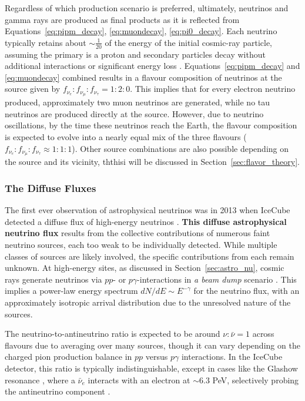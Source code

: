 Regardless of which production scenario is preferred, ultimately, neutrinos and gamma rays are produced as final products as it is reflected from Equations~\ref{eq:pipm_decay}, \ref{eq:muondecay}, \ref{eq:pi0_decay}. Each neutrino typically retains about \( \sim \frac{1}{20} \) of the energy of the initial cosmic-ray particle, assuming the primary is a proton and secondary particles decay without additional interactions or significant energy loss . Equations~\ref{eq:pipm_decay} and \ref{eq:muondecay} combined results in a flavour composition of neutrinos at the source given by $f_{\nu_e} : f_{\nu_\mu} : f_{\nu_\tau} = 1 : 2 : 0$. This implies that for every electron neutrino produced, approximately two muon neutrinos are generated, while no tau neutrinos are produced directly at the source. However, due to neutrino oscillations, by the time these neutrinos reach the Earth, the flavour composition is expected to evolve into a nearly equal mix of the three flavours ($f_{\nu_e} : f_{\nu_\mu} : f_{\nu_\tau} \approx 1 : 1 : 1$). Other source combinations are also possible depending on the source and its vicinity, ththisi will be discussed in Section~\ref{sec:flavor_theory}.

\subsubsection{The Diffuse Fluxes}
\label{sec:diffuse_theory}
The first ever observation of astrophysical neutrinos was in 2013 when IceCube detected a diffuse flux of high-energy neutrinos . \textbf{This diffuse astrophysical neutrino flux} results from the collective contributions of numerous faint neutrino sources, each too weak to be individually detected. While multiple classes of sources are likely involved, the specific contributions from each remain unknown. At high-energy sites, as discussed in Section~\ref{sec:astro_nu}, cosmic rays generate neutrinos via \(pp\)- or \(p\gamma\)-interactions in \emph{a beam dump} scenario . This implies a power-law energy spectrum \( dN/dE \sim E^{-\gamma} \) for the neutrino flux, with an approximately isotropic arrival distribution due to the unresolved nature of the sources. 

The neutrino-to-antineutrino ratio is expected to be around \( \nu:\bar{\nu} = 1 \)  across flavours due to averaging over many sources, though it can vary depending on the charged pion production balance in \( pp \) versus \( p\gamma \) interactions. In the IceCube detector, this ratio is typically indistinguishable, except in cases like the Glashow resonance , where a \( \bar{\nu}_e \) interacts with an electron at $\sim6.3$ PeV, selectively probing the antineutrino component . 

